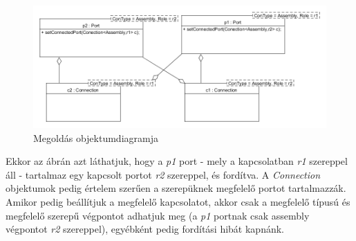 \documentclass[a4paper,12pt]{report}
\begin{document}
\begin{enumerate}
\begin{figure}[H]
\begin{center}
\includegraphics[scale=0.5]{conn_role.png}
\end{center}
\caption{Megoldás objektumdiagramja}
\end{figure}


Ekkor az ábrán azt láthatjuk, hogy a \textit{p1} port - mely a kapcsolatban \textit{r1} szereppel áll - tartalmaz egy kapcsolt portot \textit{r2} szereppel, és fordítva. A \textit{Connection} objektumok pedig értelem szerűen a szerepüknek megfelelő portot tartalmazzák. Amikor pedig beállítjuk a megfelelő kapcsolatot, akkor csak a megfelelő típusú és megfelelő szerepű végpontot adhatjuk meg (a \textit{p1} portnak csak assembly végpontot \textit{r2} szereppel), egyébként pedig fordítási hibát kapnánk. 
\end{enumerate}
\end{document}
